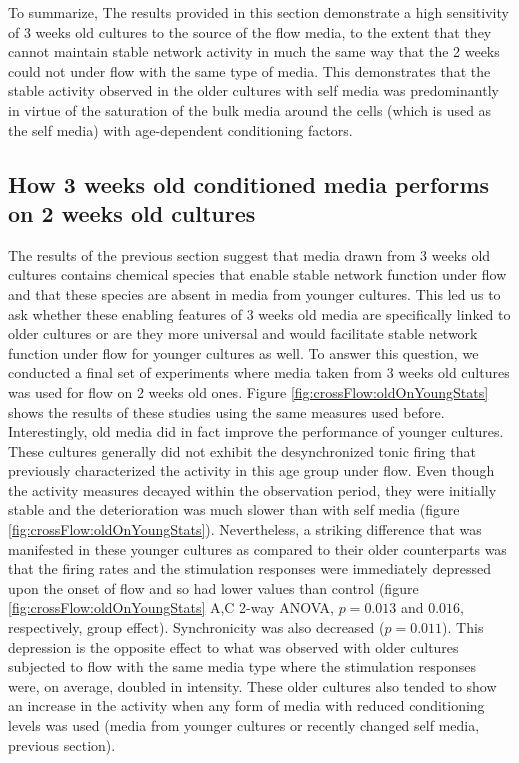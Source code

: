         To summarize, The results provided in this section demonstrate a high sensitivity of 3 weeks old cultures to the source of the flow media, to the extent that they cannot maintain stable network activity in much the same way that the 2 weeks could not under flow with the same type of media. This demonstrates that the stable activity observed in the older cultures with self media was predominantly in virtue of the saturation of the bulk media around the cells (which is used as the self media) with age-dependent conditioning factors.

        \subsection{How 3 weeks old conditioned media performs on 2 weeks old cultures}
        \label{sec:crossFlow:oldOnYoung}
        The results of the previous section suggest that media drawn from 3 weeks old cultures contains chemical species that enable stable network function under flow and that these species are absent in media from younger cultures. This led us to ask whether these enabling features of 3 weeks old media are specifically linked to older cultures or are they more universal and would facilitate stable network function under flow for younger cultures as well. To answer this question, we conducted a final set of experiments where media taken from 3 weeks old cultures was used for flow on 2 weeks old ones. Figure \ref{fig:crossFlow:oldOnYoungStats} shows the results of these studies using the same measures used before. Interestingly, old media did in fact improve the performance of younger cultures. These cultures generally did not exhibit the desynchronized tonic firing that previously characterized the activity in this age group under flow. Even though the activity measures decayed within the observation period, they were initially stable and the deterioration was much slower than with self media (figure \ref{fig:crossFlow:oldOnYoungStats}). Nevertheless, a striking difference that was manifested in these younger cultures as compared to their older counterparts was that the firing rates and the stimulation responses were immediately depressed upon the onset of flow and so had lower values than control (figure \ref{fig:crossFlow:oldOnYoungStats} A,C 2-way ANOVA, \(p=0.013\) and \(0.016\), respectively, group effect). Synchronicity was also decreased (\(p=0.011\)). This depression is the opposite effect to what was observed with older cultures subjected to flow with the same media type where the stimulation responses were, on average, doubled in intensity. These older cultures also tended to show an increase in the activity when any form of media with reduced conditioning levels was used (media from younger cultures or recently changed self media, previous section).

